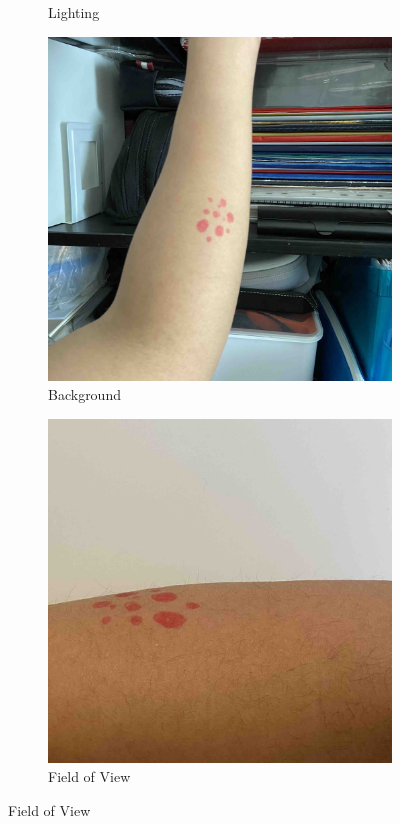 \begin{figure}[ht]
\begin{subfigure}[b]{0.24\textwidth}
        \caption{Lighting}
        \label{fig:lighting}
    \end{subfigure}
    \hfill
    \begin{subfigure}[b]{0.24\textwidth}
        \includegraphics[width=\textwidth]{img/Background.jpg}
        \caption{Background}
        \label{fig:background}
    \end{subfigure}
    \hfill
    \begin{subfigure}[b]{0.24\textwidth}
        \includegraphics[width=\textwidth]{img/FoV.jpg}
        \caption{Field of View}
        \label{fig:FoV}
    \end{subfigure} 


\end{figure}
